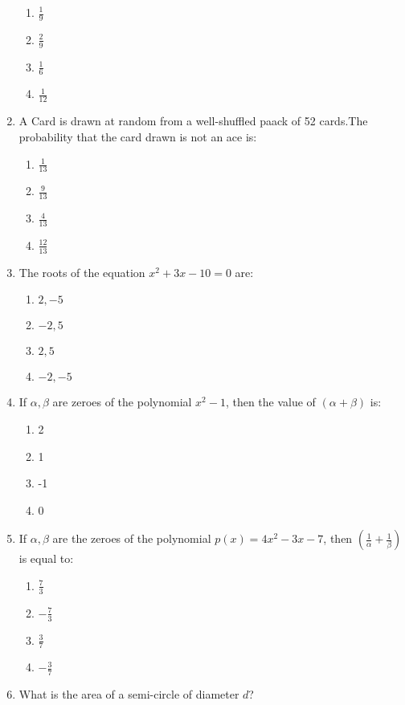 \documentclass{article}
\begin{document}
\begin{enumerate}
	\begin{enumerate}
	\item  \(\frac{1}{9}\)
	\item \(\frac{2}{9}\)
	\item  \(\frac{1}{6}\)
	\item  \(\frac{1}{12}\)
\end{enumerate}
\item A Card is drawn at random from a well-shuffled paack of 52 cards.The probability that the card drawn is not an ace is:
\begin{enumerate}
	\item \(\frac{1}{13}\)
	\item  \(\frac{9}{13}\)
	\item \(\frac{4}{13}\)
	\item \(\frac{12}{13}\)
\end{enumerate}
\item The roots of the equation \(x^2 + 3x - 10 = 0\) are:

\begin{enumerate}
    \item\(2, -5\)
    \item \(-2, 5\)
    \item \(2, 5\)
    \item \(-2, -5\)
\end{enumerate}

\item If \(\alpha, \beta\) are zeroes of the polynomial \(x^2 - 1\), then the value of \((\alpha + \beta)\) is:

\begin{enumerate}
    \item 2
    \item 1
    \item -1
    \item 0
\end{enumerate}
\newpage
\item If \( \alpha, \beta \) are the zeroes of the polynomial \( p(x) = 4x^2 - 3x - 7 \), then \( \left(\frac{1}{\alpha} + \frac{1}{\beta}\right) \) is equal to:

\begin{enumerate}
    \item \(\frac{7}{3}\)
    \item\(-\frac{7}{3}\)
    \item \(\frac{3}{7}\)
    \item \(-\frac{3}{7}\)
\end{enumerate}
\item What is the area of a semi-circle of diameter \(d\)?


\end{enumerate}
\end{document}
